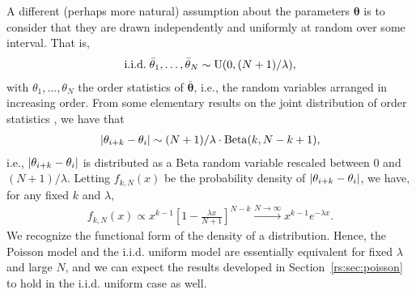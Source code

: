A different (perhaps more natural) assumption about the parameters $\bm{\theta}$ is to consider that they are drawn independently and uniformly at random over some interval.
That is,
\begin{align*}
\text{i.i.d.}\; \bar{\theta}_1, \ldots, \bar{\theta}_N \sim \mathrm{U}( 0, (N+1) / \lambda ),
\end{align*}
with $\theta_1, \ldots, \theta_N$ the order statistics of $\bar{\bm{\theta}}$, i.e., the random variables arranged in increasing order.
From some elementary results on the joint distribution of order statistics \citep[see, e.g.,][]{arnold2008first}, we have that
\begin{align*}
\lvert\theta_{i+k} - \theta_{i}\rvert \sim (N+1) / \lambda \cdot \mathrm{Beta}( k, N - k + 1 ),
\end{align*}
i.e., $\lvert\theta_{i+k} - \theta_{i}\rvert$ is distributed as a Beta random variable rescaled between $0$ and $(N+1) / \lambda$.
Letting $f_{k,N}(x)$ be the probability density of $\lvert\theta_{i+k} - \theta_{i}\rvert$, we have, for any fixed $k$ and $\lambda$,
\begin{align*}
f_{k,N}(x) \propto x^{k-1} \left[ 1 - \frac{\lambda x}{N + 1} \right]^{N - k} \xrightarrow{N \to \infty} x^{k-1} e^{-\lambda x}.
\end{align*}
We recognize the functional form of the density of a  distribution.
Hence, the Poisson model and the i.i.d. uniform model are essentially equivalent for fixed $\lambda$ and large $N$, and we can expect the results developed in Section~\ref{rs:sec:poisson} to hold in the i.i.d. uniform case as well.
